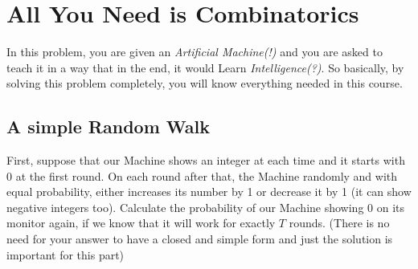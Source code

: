 \section{All You Need is Combinatorics  }
In this problem, you are given an \textit{Artificial Machine(!)} and you are asked to teach it in a way
that in the end, it would Learn \textit{Intelligence(?)}. So basically, by solving this problem completely,
you will know everything needed in this course.
\subsection{A simple Random Walk}
First, suppose that our Machine shows an integer at each time and it starts with 0 at the first
round. On each round after that, the Machine randomly and with equal probability, either
increases its number by 1 or decrease it by 1 (it can show negative integers too). Calculate the
probability of our Machine showing 0 on its monitor again, if we know that it will work for
exactly $T$ rounds. (There is no need for your answer to have a closed and simple form and just
the solution is important for this part)
